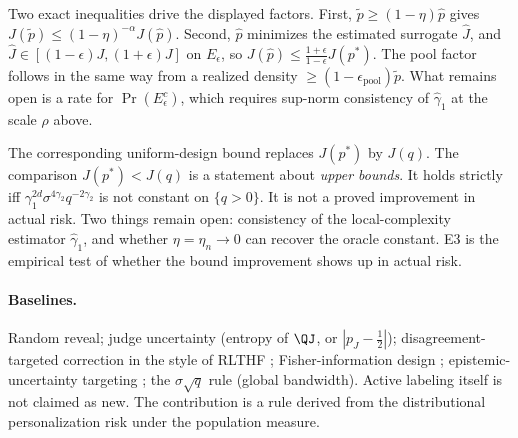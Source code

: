 Two exact inequalities drive the displayed factors. First, $\tilde p\ge(1-\eta)\hat p$ gives
$J(\tilde p)\le(1-\eta)^{-\alpha}J(\hat p)$. Second, $\hat p$ minimizes the estimated surrogate
$\hat J$, and $\hat J\in[(1-\epsilon)J,(1+\epsilon)J]$ on $E_\epsilon$, so
$J(\hat p)\le\frac{1+\epsilon}{1-\epsilon}J(p^{*})$. The pool factor follows in the same way from a
realized density $\ge(1-\epsilon_{\mathrm{pool}})\tilde p$. What remains open is a rate for
$\Pr(E_\epsilon^c)$, which requires sup-norm consistency of $\hat\gamma_1$ at the scale $\rho$ above.

The corresponding uniform-design bound replaces $J(p^{*})$ by $J(q)$. The comparison
$J(p^{*})<J(q)$ is a statement about \emph{upper bounds}. It holds strictly iff
$\gamma_1^{2d}\sigma^{4\gamma_2}q^{-2\gamma_2}$ is not constant on $\{q>0\}$. It is not a proved
improvement in actual risk. Two things remain open: consistency of the local-complexity estimator
$\hat\gamma_1$, and whether $\eta=\eta_n\to0$ can recover the oracle constant. E3 is the empirical
test of whether the bound improvement shows up in actual risk.

\paragraph{Baselines.}
Random reveal; judge uncertainty (entropy of $\QJ$, or $|p_J-\tfrac12|$); disagreement-targeted
correction in the style of RLTHF \citep{xu2025rlthf}; Fisher-information design \citep{shen2025active};
epistemic-uncertainty targeting \citep{lail2026decomposing}; the $\sigma\sqrt q$ rule (global
bandwidth). Active labeling itself is not claimed as new. The contribution is a rule derived from the
distributional personalization risk under the population measure.
